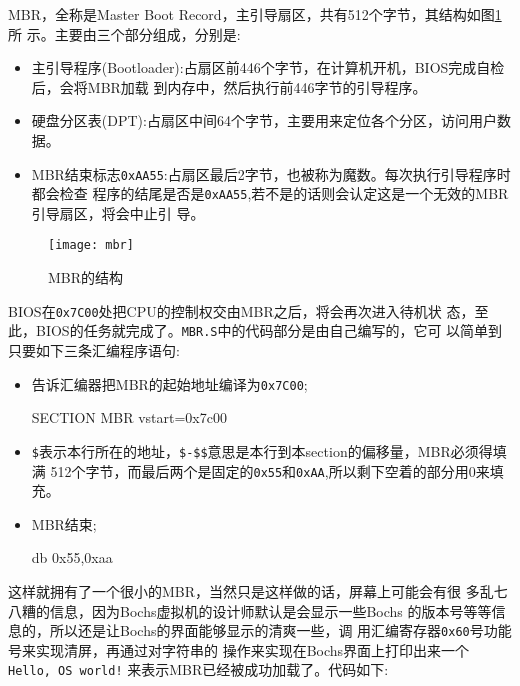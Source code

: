MBR，全称是Master Boot Record，主引导扇区，共有512个字节，其结构如图\ref{fig:mbr}所
示。主要由三个部分组成，分别是:
\begin{itemize}
\item 主引导程序(Bootloader):占扇区前446个字节，在计算机开机，BIOS完成自检后，会将MBR加载
  到内存中，然后执行前446字节的引导程序。
\item 硬盘分区表(DPT):占扇区中间64个字节，主要用来定位各个分区，访问用户数据。
\item MBR结束标志\texttt{0xAA55}:占扇区最后2字节，也被称为魔数。每次执行引导程序时都会检查
  程序的结尾是否是\texttt{0xAA55},若不是的话则会认定这是一个无效的MBR引导扇区，将会中止引
  导。
\end{itemize}

\begin{figure}
  \centering
  \texttt{[image: mbr]}
  \caption{MBR的结构}
  \label{fig:mbr}
\end{figure}

BIOS在\texttt{0x7C00}处把CPU的控制权交由MBR之后，将会再次进入待机状
态，至此，BIOS的任务就完成了。\texttt{MBR.S}中的代码部分是由自己编写的，它可
以简单到只要如下三条汇编程序语句:%
\begin{itemize}
\item 告诉汇编器把MBR的起始地址编译为\texttt{0x7C00};
\begin{codeblock}
\begin{nasmcode}
 SECTION MBR vstart=0x7c00
\end{nasmcode}
\end{codeblock}
\item \verb'$'表示本行所在的地址，\verb'$-$$'意思是本行到本section的偏移量，MBR必须得填满
  512个字节，而最后两个是固定的\texttt{0x55}和\texttt{0xAA},所以剩下空着的部分用0来填充。
\begin{codeblock}
\end{codeblock}
\item MBR结束;
\begin{codeblock}
\begin{nasmcode}
 db 0x55,0xaa  
\end{nasmcode}
\end{codeblock}  
\end{itemize}

这样就拥有了一个很小的MBR，当然只是这样做的话，屏幕上可能会有很
多乱七八糟的信息，因为Bochs虚拟机的设计师默认是会显示一些Bochs
的版本号等等信息的，所以还是让Bochs的界面能够显示的清爽一些，调
用汇编寄存器\texttt{0x60}号功能号来实现清屏，再通过对字符串的
操作来实现在Bochs界面上打印出来一个\texttt{Hello, OS world!}
来表示MBR已经被成功加载了。代码如下:%

